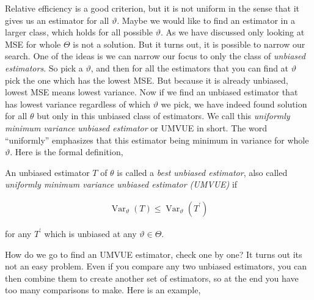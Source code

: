 \documentclass[ 11pt,%
				a4paper,%
				twoside,%
				headinclude,%
				footinclude = true,%
				cleardoublepage = empty,%
				reqno]{scrbook}
\begin{document}
Relative efficiency is a good criterion, but it is not uniform in the sense that it gives us an estimator for all $\vartheta$. Maybe we would like to find an estimator in a larger class, which holds for all possible $\vartheta$. As we have discussed only looking at MSE for whole $\Theta$ is not a solution. But it turns out, it is possible to narrow our search. One of the ideas is we can narrow our focus to only the class of \emph{unbiased estimators}. So pick a $\vartheta$, and then for all the estimators that you can find at $\vartheta$ pick the one which has the lowest MSE. But because it is already unbiased, lowest MSE means lowest variance. Now if we find an unbiased estimator that has lowest variance regardless of which $\vartheta$ we pick, we have indeed found solution for all $\theta$ but only in this unbiased class of estimators. We call this \emph{uniformly minimum variance unbiased estimator} or UMVUE in short. The word ``uniformly'' emphasizes that this estimator being minimum in variance for whole $\vartheta$. Here is the formal definition,


\begin{definition}
An unbiased estimator $T$ of $\theta$ is called a \emph{best unbiased  estimator}, also called \emph{uniformly minimum variance unbiased estimator (UMVUE)} if 

\begin{align*}
  \operatorname{Var}_{\vartheta}(T) \leq \operatorname{Var}_{\vartheta}(T^{'}) 
\end{align*}

for any $T^{'}$ which is unbiased at any $\vartheta \in \Theta$.

\end{definition}
 

How do we go to find an UMVUE estimator, check one by one? It turns out its not an easy problem. Even if you compare any two unbiased estimators, you can then combine them to create another set of estimators, so at the end you have too many comparisons to make. Here is an example, 
\end{document}

